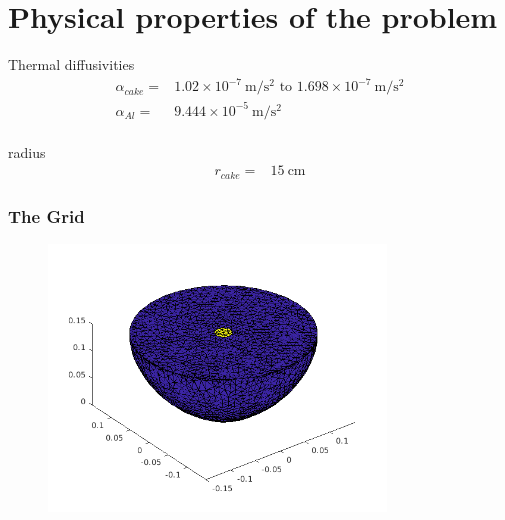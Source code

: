 
\section{Physical properties of the problem}
\begin{frame}
\begin{block}{Thermal diffusivities}
\begin{align*}
\alpha_{cake}=&1.02\times 10^{-7} \SI{}{\meter/\second^2 } \text{ to } 1.698\times 10^{-7} \SI{}{\meter/\second^2}\\
\alpha_{Al} =&9.444\times 10^{-5} \SI{}{\meter/\second^2}\\
\end{align*}
\end{block}
\begin{block}{radius}
\begin{align*}
r_{cake} =& 15\SI{}{\centi\meter}
\end{align*}
\end{block}
\end{frame}

\begin{frame}
\frametitle{The Grid}
\begin{figure}[htp]
        \centering
        \includegraphics[width=0.8\textwidth]{figures/mesh.png}
\end{figure}
\end{frame}
